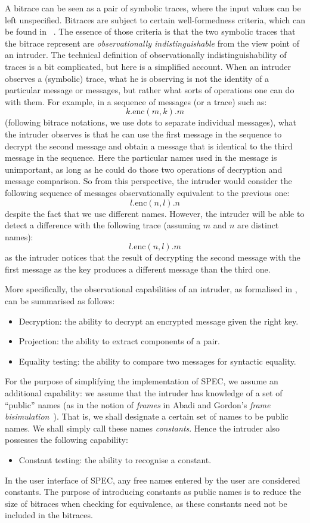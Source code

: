 \documentclass{article}
\begin{document}
A bitrace can be seen as a pair of symbolic traces, where the input values can be left unspecified. 
Bitraces are subject to certain well-formedness criteria, which can be found in ~\cite{tiu09corr}. 
The essence of those criteria is that the two symbolic traces that the bitrace represent are
{\em observationally indistinguishable} from the view point of an intruder.
The technical definition of observationally indistinguishability of traces is a bit complicated,
but here is a simplified account. When an intruder observes a (symbolic) trace, what he is observing
is not the identity of a particular message or messages, but rather what sorts of operations
one can do with them. For example, in a sequence of messages (or a trace) such as:
$$k . \mathrm{enc}(m, k) . m$$
(following bitrace notations, we use dots to separate individual messages), what
the intruder observes is that he can use the first message in the sequence to
decrypt the second message and obtain a message that is identical to the third message
in the sequence. Here the particular names used in the 
message is unimportant, as long as he could do those two operations of decryption and
message comparison. So from this perspective, the intruder would consider the following
sequence of messages observationally equivalent to the previous one:
$$l . \mathrm{enc}(n, l) . n$$
despite the fact that we use different names. However, the intruder will be able to detect
a difference with the following trace (assuming $m$ and $n$ are distinct names):
$$l . \mathrm{enc}(n, l) . m$$
as the intruder notices that the result of decrypting the second message with the first
message as the key produces a different message than the third one.

More specifically, the observational capabilities of an intruder, as formalised in \cite{abadi98njc},
can be summarised as follows:
\begin{itemize}
\item Decryption: the ability to decrypt an encrypted message given the right key. 
\item Projection: the ability to extract components of a pair. 
\item Equality testing: the ability to compare two messages for syntactic equality. 
\end{itemize}
For the purpose of simplifying the implementation of SPEC, we assume an additional
capability: we assume that the intruder has knowledge of a set of ``public'' names
(as in the notion of {\em frames} in Abadi and Gordon's {\em frame bisimulation}~\cite{abadi98njc}). 
That is, we shall designate a certain set of names to be public names. We shall simply
call these names {\em constants}. Hence the intruder also possesses the following capability: 
\begin{itemize}
\item Constant testing: the ability to recognise a constant. 
\end{itemize}
In the user interface of SPEC, any free names entered by the user are considered constants. 
The purpose of introducing constants as public names is to reduce the size of bitraces
when checking for equivalence, as these constants need not be included in the bitraces. 
\end{document}
